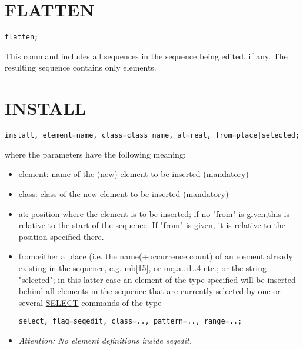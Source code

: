 \section{FLATTEN}
\label{sec:flatten}
\begin{verbatim}
flatten;
\end{verbatim} 
This command includes all sequences in the sequence being edited, if
any. The resulting sequence contains only elements.  

\section{INSTALL}
\label{sec:install}
\begin{verbatim}
install, element=name, class=class_name, at=real, from=place|selected;
\end{verbatim} 
where the parameters have the following meaning: 
\begin{itemize}
   \item element: name of the (new) element to be inserted (mandatory) 
   \item class: class of the new element to be inserted (mandatory) 
   \item at: position where the element is to be inserted; if no "from"
     is given,this is relative to the start of the sequence. If "from"
     is given, it is relative to the position specified there. 
   \item from:either a place (i.e. the name(+occurrence count) of an
     element already existing in the sequence, e.g. mb[15], or
     mq.a..i1..4 etc.; or the string "selected"; in this latter case an
     element of the type specified will be inserted behind all elements
     in the sequence that are currently selected by one or several
     \href{../Introduction/select.html}{SELECT} commands of the type 
\begin{verbatim}
select, flag=seqedit, class=.., pattern=.., range=..;
\end{verbatim} 
   \item \textit{ Attention: No element definitions inside seqedit. }
\end{itemize}

